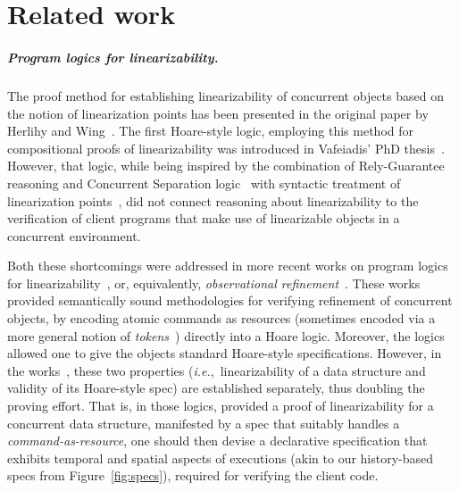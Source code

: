\documentclass[a4paper,UKenglish]{lipics-v2016}
\newcommand{\ie}{\emph{i.e.}\xspace}
\newcommand{\cf}{\textit{cf.}\xspace}
\theoremstyle{definition}
\begin{document}
\section{Related work}
\label{sc:related}


\subparagraph*{Program logics for linearizability.}

The proof method for establishing linearizability of concurrent
objects based on the notion of linearization points has been presented
in the original paper by Herlihy and
Wing~\cite{HerlihyW+TOPLAS90}. The first Hoare-style logic, employing
this method for compositional proofs of linearizability was introduced
in Vafeiadis' PhD thesis~\cite{VafeiadisHHS+PPoPP06, Vafeiadis+PhD07}.
However, that logic, while being inspired by the combination of
Rely-Guarantee reasoning and Concurrent Separation
logic~\cite{VafeiadisP+CONCUR07} with syntactic treatment of
linearization points~\cite{VafeiadisHHS+PPoPP06}, did not connect
reasoning about linearizability to the verification of client programs
that make use of linearizable objects in a concurrent environment.


%


Both these shortcomings were addressed in more recent works on program
logics for linearizability~\cite{LiangF+PLDI13,KhyzhaGP+FM16}, or,
equivalently, \emph{observational
  refinement}~\cite{FilipovicOHRW+TCS10,TuronDB+ICFP13}. These works
provided semantically sound methodologies for verifying refinement of
concurrent objects, by encoding atomic commands as resources
(sometimes encoded via a more general notion of
\emph{tokens}~\cite{KhyzhaGP+FM16}) directly into a Hoare
logic. Moreover, the logics~\cite{LiangF+PLDI13, TuronDB+ICFP13}
allowed one to give the objects standard Hoare-style specifications.
%
However, in the works~\cite{LiangF+PLDI13,TuronDB+ICFP13}, these two
properties (\ie,~linearizability of a data structure and validity of
its Hoare-style spec) are established separately, thus doubling the
proving effort.
%
That is, in those logics, provided a proof of linearizability for a
concurrent data structure, manifested by a spec that suitably handles
a \emph{command-as-resource}, one should then devise a declarative
specification that exhibits temporal and spatial aspects of executions
(akin to our history-based specs from Figure~\ref{fig:specs}),
required for verifying the client code.
\end{document}
